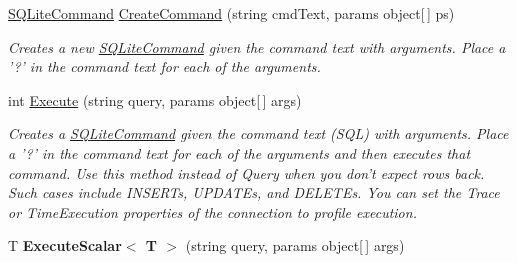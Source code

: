 \begin{DoxyCompactItemize}
\item 
\hyperlink{classSQLite_1_1SQLiteCommand}{S\-Q\-Lite\-Command} \hyperlink{classSQLite_1_1SQLiteConnection_a112ac999fccd302bda742992f044f3ee}{Create\-Command} (string cmd\-Text, params object\mbox{[}$\,$\mbox{]} ps)
\begin{DoxyCompactList}\small\item\em Creates a new \hyperlink{classSQLite_1_1SQLiteCommand}{S\-Q\-Lite\-Command} given the command text with arguments. Place a '?' in the command text for each of the arguments. \end{DoxyCompactList}\item 
int \hyperlink{classSQLite_1_1SQLiteConnection_a5fbb3e385d21cfbee95e4a2a71a3043b}{Execute} (string query, params object\mbox{[}$\,$\mbox{]} args)
\begin{DoxyCompactList}\small\item\em Creates a \hyperlink{classSQLite_1_1SQLiteCommand}{S\-Q\-Lite\-Command} given the command text (S\-Q\-L) with arguments. Place a '?' in the command text for each of the arguments and then executes that command. Use this method instead of Query when you don't expect rows back. Such cases include I\-N\-S\-E\-R\-Ts, U\-P\-D\-A\-T\-Es, and D\-E\-L\-E\-T\-Es. You can set the Trace or Time\-Execution properties of the connection to profile execution. \end{DoxyCompactList}\item 
\hypertarget{classSQLite_1_1SQLiteConnection_af88acbe7da213c81875c3a35a5d61337}{T {\bfseries Execute\-Scalar$<$ T $>$} (string query, params object\mbox{[}$\,$\mbox{]} args)}\label{classSQLite_1_1SQLiteConnection_af88acbe7da213c81875c3a35a5d61337}


\end{DoxyCompactItemize}

